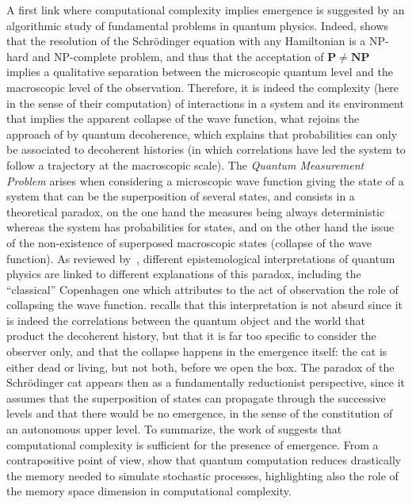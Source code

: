 A first link where computational complexity implies emergence is suggested by an algorithmic study of fundamental problems in quantum physics. Indeed, \cite{2014arXiv1403.7686B} shows that the resolution of the Schrödinger equation with any Hamiltonian is a NP-hard and NP-complete problem, and thus that the acceptation of $\mathbf{P}\neq\mathbf{NP}$ implies a qualitative separation between the microscopic quantum level and the macroscopic level of the observation. Therefore, it is indeed the complexity (here in the sense of their computation) of interactions in a system and its environment that implies the apparent collapse of the wave function, what rejoins the approach of \cite{gell1996quantum} by quantum decoherence, which explains that probabilities can only be associated to decoherent histories (in which correlations have led the system to follow a trajectory at the macroscopic scale). The \emph{Quantum Measurement Problem} arises when considering a microscopic wave function giving the state of a system that can be the superposition of several states, and consists in a theoretical paradox, on the one hand the measures being always deterministic whereas the system has probabilities for states, and on the other hand the issue of the non-existence of superposed macroscopic states (collapse of the wave function). As reviewed by~\cite{schlosshauer2005decoherence}, different epistemological interpretations of quantum physics are linked to different explanations of this paradox, including the ``classical'' Copenhagen one which attributes to the act of observation the role of collapsing the wave function. \cite{gell1996quantum} recalls that this interpretation is not absurd since it is indeed the correlations between the quantum object and the world that product the decoherent history, but that it is far too specific to consider the observer only, and that the collapse happens in the emergence itself: the cat is either dead or living, but not both, before we open the box. The paradox of the Schrödinger cat appears then as a fundamentally reductionist perspective, since it assumes that the superposition of states can propagate through the successive levels and that there would be no emergence, in the sense of the constitution of an autonomous upper level. To summarize, the work of \cite{2014arXiv1403.7686B} suggests that computational complexity is sufficient for the presence of emergence. From a contrapositive point of view, \cite{2017arXiv170404231E} show that quantum computation reduces drastically the memory needed to simulate stochastic processes, highlighting also the role of the memory space dimension in computational complexity.


